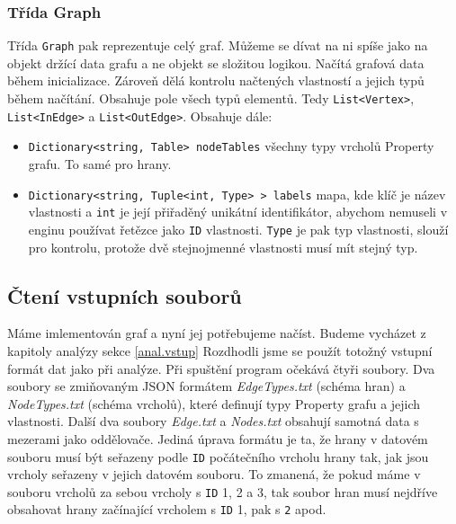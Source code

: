 \subsubsection{Třída Graph}

Třída \texttt{Graph} pak reprezentuje celý graf.
Můžeme se dívat na ni spíše jako na objekt držící data grafu a ne objekt se složitou logikou.
Načítá grafová data během inicializace.
Zároveň dělá kontrolu načtených vlastností a jejich typů během načítání.
Obsahuje pole všech typů elementů. Tedy \texttt{List<Vertex>}, \texttt{List<InEdge>} a \texttt{List<OutEdge>}.
Obsahuje dále:
\begin{itemize}
\item \texttt{Dictionary<string, Table> nodeTables} všechny typy vrcholů Property grafu. To samé pro hrany.
\item \texttt{Dictionary<string, Tuple<int, Type> > labels} mapa, kde klíč je název vlastnosti a \texttt{int} je její přiřaděný unikátní identifikátor, abychom nemuseli v enginu používat řetězce jako \texttt{ID} vlastnosti.
\texttt{Type} je pak typ vlastnosti, slouží pro kontrolu, protože dvě stejnojmenné vlastnosti musí mít stejný typ. 
\end{itemize}


\subsection{Čtení vstupních souborů}

Máme imlementován graf a nyní jej potřebujeme načíst.
Budeme vycházet z kapitoly analýzy sekce \ref{anal.vstup}
Rozdhodli jsme se použít totožný vstupní formát dat jako při analýze.
Při spuštění program očekává čtyři soubory.
Dva soubory se zmiňovaným JSON formátem \textit{EdgeTypes.txt} (schéma hran) a \textit{NodeTypes.txt} (schéma vrcholů), které definují typy Property grafu a jejich vlastnosti.
Další dva soubory \textit{Edge.txt} a \textit{Nodes.txt} obsahují samotná data s mezerami jako oddělovače.
Jediná úprava formátu je ta, že hrany v datovém souboru musí být seřazeny podle \texttt{ID} počátečního vrcholu hrany tak, jak jsou vrcholy seřazeny v jejich datovém souboru.
To zmanená, že pokud máme v souboru vrcholů za sebou vrcholy s \texttt{ID} 1, 2 a 3, tak soubor hran musí nejdříve obsahovat hrany začínající vrcholem s \texttt{ID} 1, pak s \texttt{2} apod.

